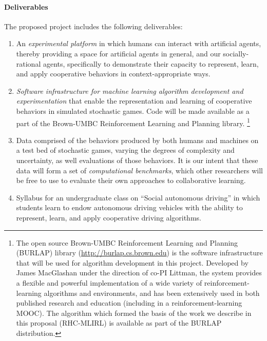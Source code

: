 
\vspace{\up}
\paragraph{Deliverables}

The proposed project includes the following deliverables: 

\begin{enumerate}

\item An {\em experimental platform\/} in which humans can interact
  with artificial agents, thereby providing a space for artificial
  agents in general, and our socially-rational agents, specifically to
  demonstrate their capacity to represent, learn, and apply
  cooperative behaviors in context-appropriate ways.

\item {\em Software infrastructure for machine learning algorithm
  development and experimentation\/} that enable the representation
  and learning of cooperative behaviors in simulated stochastic games.
  Code will be made available as a part of the Brown-UMBC
  Reinforcement Learning and Planning library.%
\footnote{The open source Brown-UMBC Reinforcement Learning and
  Planning (BURLAP) library (\url{http://burlap.cs.brown.edu}) is the
  software infrastructure that will be used for algorithm development
  in this project.  Developed by James MacGlashan under the direction
  of co-PI Littman, the system provides a flexible and powerful
  implementation of a wide variety of reinforcement-learning
  algorithms and environments, and has been extensively used in both
  published research and education (including in a
  reinforcement-learning MOOC).  The algorithm which formed the basis
  of the work we describe in this proposal (RHC-MLIRL) is available as
  part of the BURLAP distribution.}

\item Data comprised of the behaviors produced by both humans and
  machines on a test bed of stochastic games, varying the degrees of
  complexity and uncertainty, as well evaluations of those behaviors.
  It is our intent that these data will form a set of {\em
    computational benchmarks}, which other researchers will be free to
  use to evaluate their own approaches to collaborative learning.

\item Syllabus for an undergraduate class on ``Social autonomous
  driving'' in which students learn to endow autonomous driving
  vehicles with the ability to represent, learn, and apply cooperative
  driving algorithms.

\end{enumerate}

